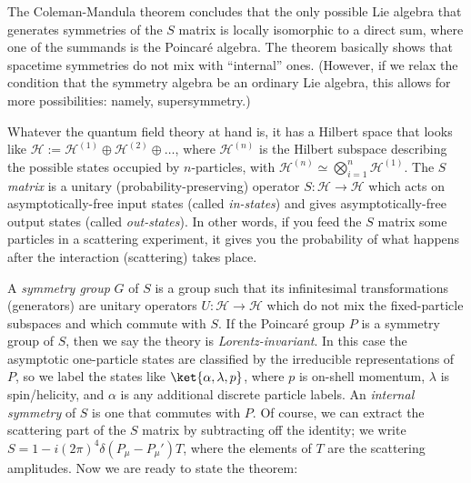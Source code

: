 

The Coleman-Mandula theorem 
concludes that the only possible Lie algebra that generates symmetries of the $S$ matrix is locally isomorphic
to a direct sum, where one of the summands is the Poincaré algebra. The theorem basically shows that
spacetime symmetries do not mix with “internal” ones. (However, if we relax
the condition that the symmetry algebra be an ordinary Lie algebra, this allows for more possibilities: namely, supersymmetry.)

 Whatever the quantum field theory at hand is, it has a Hilbert space that looks like $\mathcal{H} := \mathcal{H}^{(1)} \oplus \mathcal{H}^{(2)}\oplus \dots$, where $\mathcal{H}^{(n)}$ is the Hilbert subspace describing the possible states occupied by $n$-particles, with  $\mathcal{H}^{(n)}\simeq  \bigotimes^n_{i=1} \mathcal{H}^{(1)}$.
   The \textit{$S$ matrix} is a unitary (probability-preserving) operator $S: \mathcal{H}\to\mathcal{H}$ which acts on asymptotically-free input states (called \textit{in-states}) and gives asymptotically-free output states (called \textit{out-states}). In other words, if you feed the $S$ matrix some particles in a scattering experiment, it gives you the probability of what happens after the interaction (scattering) takes place.  

A \textit{symmetry group} $G$ of $S$ is a group such that its infinitesimal transformations (generators) are unitary operators $U:\mathcal{H}\to\mathcal{H}$ which do not mix the fixed-particle subspaces and which commute  with $S$. If the Poincar\'e group $P$ is a symmetry group of $S$, then we say    the theory is \textit{Lorentz-invariant}. In this case the asymptotic one-particle states are classified by the irreducible representations of $P$, so we label the states like   $\ket{\alpha,\lambda,p}$, where $p$ is on-shell momentum, $\lambda$ is spin/helicity, and $\alpha$ is any additional discrete particle labels.  An \textit{internal symmetry} of $S$ is one that commutes with $P$.  Of course, we can extract the scattering part of the $S$ matrix by subtracting off the identity; we write $S = 1 - i(2\pi)^4 \delta(P_\mu - P_\mu') T$, where the elements of $T$ are the scattering amplitudes. Now we are ready to state the theorem: 

